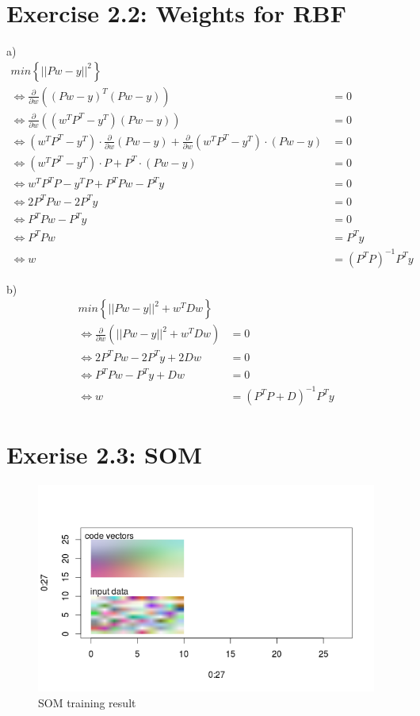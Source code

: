 \documentclass{scrartcl}
\begin{document}
\section{Exercise 2.2: Weights for RBF}

a)
\begin{align*}
  min \left\{ || P w-y ||^2\right\} &\\
 \Leftrightarrow  \frac{\partial}{\partial w} \left( (P w-y)^T (P w-y)\right) & = 0 \\
 \Leftrightarrow  \frac{\partial}{\partial w} \left( (w^T P^T -y^T) (P w-y)\right) & = 0 \\
 \Leftrightarrow  (w^T P^T -y^T) \cdot \frac{\partial}{\partial w} \left( P w-y\right) + \frac{\partial}{\partial w} \left( w^T P^T -y^T \right) \cdot (P w-y) & = 0 \\
 \Leftrightarrow  (w^T P^T -y^T) \cdot  P + P^T \cdot (P w-y) & = 0 \\
 \Leftrightarrow  w^T P^T P - y^T P + P^T P w - P^T y & = 0  \\
 \Leftrightarrow  2 P^T P w - 2 P^T y & = 0 \\
 \Leftrightarrow  P^T P w - P^T y & = 0 \\
 \Leftrightarrow  P^T P w & = P^T y \\
 \Leftrightarrow w & = (P^T P)^{-1} P^T y
\end{align*}

b)
\begin{align*}
      min \left\{ || P w-y ||^2 + w^T D w \right\} &\\
     \Leftrightarrow  \frac{\partial}{\partial w} \left(|| P w-y ||^2 + w^T D w\right) & = 0 \\
     \Leftrightarrow  2 P^T P w - 2 P^T y + 2 D w & = 0 \\
     \Leftrightarrow  P^T P w - P^T y + D w& = 0 \\
     \Leftrightarrow w & = (P^T P + D)^{-1} P^T y
\end{align*}


\section{Exerise 2.3: SOM}

\begin{figure}
    \centering
    \includegraphics{img/2_3som_sub.png}
    \caption{SOM training result}
\end{figure}
\end{document}

